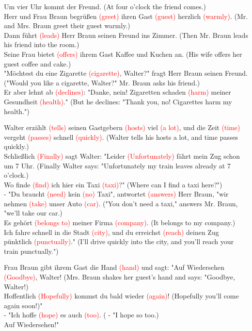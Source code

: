 \documentclass{article}
\begin{document}
Um vier Uhr kommt der Freund. (At four o'clock the friend comes.) \\
Herr und Frau Braun begrüßen \textcolor{red}{(greet)} ihren Gast \textcolor{red}{(guest)} herzlich \textcolor{red}{(warmly)}. (Mr. and Mrs. Braun greet their guest warmly.) \\
Dann führt \textcolor{red}{(leads)} Herr Braun seinen Freund ins Zimmer. (Then Mr. Braun leads his friend into the room.) \\
Seine Frau bietet \textcolor{red}{(offers)} ihrem Gast Kaffee und Kuchen an. (His wife offers her guest coffee and cake.) \\
"Möchtest du eine Zigarette \textcolor{red}{(cigarette)}, Walter?" fragt Herr Braun seinen Freund. ("Would you like a cigarette, Walter?" Mr. Braun asks his friend.) \\
Er aber lehnt ab \textcolor{red}{(declines)}: "Danke, nein! Zigaretten schaden \textcolor{red}{(harm)} meiner Gesundheit \textcolor{red}{(health)}." (But he declines: "Thank you, no! Cigarettes harm my health.")

Walter erzählt \textcolor{red}{(tells)} seinen Gastgebern \textcolor{red}{(hosts)} viel \textcolor{red}{(a lot)}, und die Zeit \textcolor{red}{(time)} vergeht \textcolor{red}{(passes)} schnell \textcolor{red}{(quickly)}. (Walter tells his hosts a lot, and time passes quickly.) \\
Schließlich \textcolor{red}{(Finally)} sagt Walter: "Leider \textcolor{red}{(Unfortunately)} fährt mein Zug schon um 7 Uhr. (Finally Walter says: "Unfortunately my train leaves already at 7 o'clock.) \\
Wo finde \textcolor{red}{(find)} ich hier ein Taxi \textcolor{red}{(taxi)}?" (Where can I find a taxi here?") \\
- "Du braucht \textcolor{red}{(need)} kein \textcolor{red}{(no)} Taxi", antwortet \textcolor{red}{(answers)} Herr Braun, "wir nehmen \textcolor{red}{(take)} unser Auto \textcolor{red}{(car)}. ("You don't need a taxi," answers Mr. Braun, "we'll take our car.) \\
Es gehört \textcolor{red}{(belongs to)} meiner Firma \textcolor{red}{(company)}. (It belongs to my company.) \\
Ich fahre schnell in die Stadt \textcolor{red}{(city)}, und du erreichst \textcolor{red}{(reach)} deinen Zug pünktlich \textcolor{red}{(punctually)}." (I'll drive quickly into the city, and you'll reach your train punctually.")

Frau Braun gibt ihrem Gast die Hand \textcolor{red}{(hand)} und sagt: "Auf Wiedersehen \textcolor{red}{(Goodbye)}, Walter! (Mrs. Braun shakes her guest's hand and says: "Goodbye, Walter!) \\
Hoffentlich \textcolor{red}{(Hopefully)} kommst du bald wieder \textcolor{red}{(again)}! (Hopefully you'll come again soon!)" \\
- "Ich hoffe \textcolor{red}{(hope)} es auch \textcolor{red}{(too)}. ( - "I hope so too.) \\
Auf Wiedersehen!"
\end{document}
